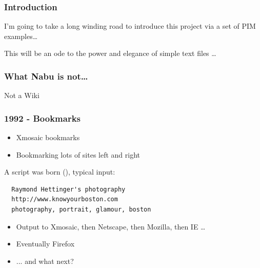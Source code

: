 \documentclass{beamer}
\begin{document}
% 

\begin{frame}[fragile]
  \frametitle{Introduction}

  I'm going to take a long winding road to introduce this project via a set of
  PIM examples\dots

\vfill\pause

  This will be an ode to the power and elegance of simple text files \dots


\end{frame}


\begin{frame}[fragile]
  \frametitle{What Nabu is not\dots}

Not a Wiki



\end{frame}


\begin{frame}[fragile]
  \frametitle{1992 - Bookmarks}

  \begin{itemize}
    \item Xmosaic bookmarks
    \item Bookmarking lots of sites left and right
  \end{itemize}

\pause
A script was born (\verb@bmmgr@), typical input:


\begin{verbatim}
  Raymond Hettinger's photography
  http://www.knowyourboston.com
  photography, portrait, glamour, boston
\end{verbatim}

  \begin{itemize}
    \item Output to Xmosaic, then Netscape, then Mozilla, then IE \dots
    \item Eventually Firefox
    \item ... and what next?
  \end{itemize}


\end{frame}
\end{document}
